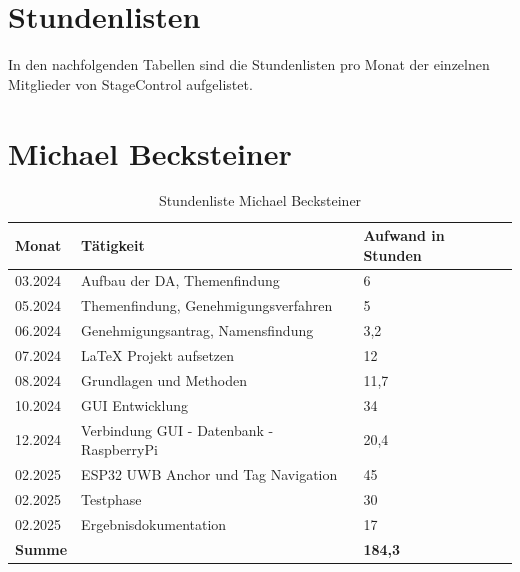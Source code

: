 \section*{Stundenlisten}
In den nachfolgenden Tabellen sind die Stundenlisten pro Monat der einzelnen Mitglieder von StageControl aufgelistet.

\section*{Michael Becksteiner}

\begin{table}[h]
	\begin{tabular}{p{2.5cm} p{10.5cm} p{2.5cm}}
		\hline
		\textbf{Monat} & \textbf{Tätigkeit} & \textbf{Aufwand in Stunden} \\
		\hline
		03.2024 & Aufbau der DA, Themenfindung & 6 \\
		05.2024 & Themenfindung, Genehmigungsverfahren & 5 \\
		06.2024 & Genehmigungsantrag, Namensfindung & 3,2 \\
		07.2024 & LaTeX Projekt aufsetzen& 12 \\
		08.2024 & Grundlagen und Methoden & 11,7 \\
		10.2024 & GUI Entwicklung & 34 \\
		12.2024 & Verbindung GUI - Datenbank - RaspberryPi & 20,4 \\
		02.2025 & ESP32 UWB Anchor und Tag Navigation & 45 \\
		02.2025 & Testphase & 30 \\
		02.2025 &Ergebnisdokumentation & 17 \\
		
		\hline
		\textbf{Summe} & & \textbf{184,3} \\
		\hline
	\end{tabular}
	\caption{Stundenliste Michael Becksteiner}
	\label{tab:arbeitsaufwand_Becksteiner}
\end{table}

\newpage
